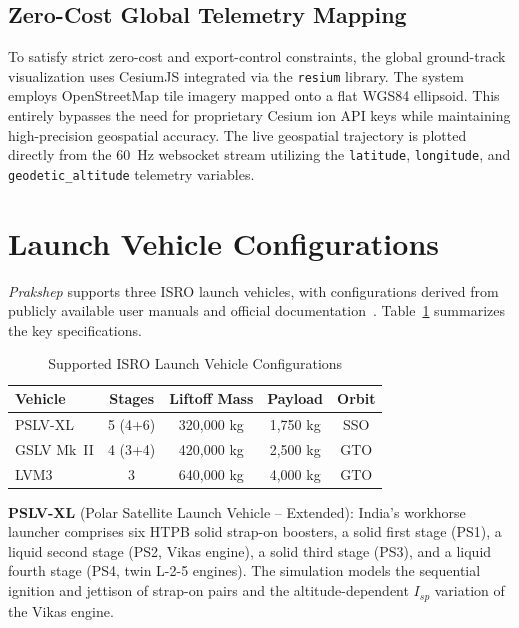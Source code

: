\documentclass[conference]{IEEEtran}
\begin{document}
\subsection{Zero-Cost Global Telemetry Mapping}

To satisfy strict zero-cost and export-control constraints, the global ground-track visualization uses CesiumJS integrated via the \texttt{resium} library. The system employs OpenStreetMap tile imagery mapped onto a flat WGS84 ellipsoid. This entirely bypasses the need for proprietary Cesium ion API keys while maintaining high-precision geospatial accuracy. The live geospatial trajectory is plotted directly from the 60~Hz websocket stream utilizing the \texttt{latitude}, \texttt{longitude}, and \texttt{geodetic\_altitude} telemetry variables.

\section{Launch Vehicle Configurations}

\textit{Prakshep} supports three ISRO launch vehicles, with configurations derived from publicly available user manuals and official documentation~\cite{isro_pslv_manual, isro_gslv_manual}. Table~\ref{tab:vehicles} summarizes the key specifications.

\begin{table}[htbp]
    \centering
    \caption{Supported ISRO Launch Vehicle Configurations}
    \label{tab:vehicles}
    \begin{tabular}{@{}lcccc@{}}
        \toprule
        \textbf{Vehicle} & \textbf{Stages} & \textbf{Liftoff Mass} & \textbf{Payload} & \textbf{Orbit} \\
        \midrule
        PSLV-XL & 5 (4+6) & 320,000 kg & 1,750 kg & SSO \\
        GSLV Mk~II & 4 (3+4) & 420,000 kg & 2,500 kg & GTO \\
        LVM3 & 3 & 640,000 kg & 4,000 kg & GTO \\
        \bottomrule
    \end{tabular}
\end{table}

\textbf{PSLV-XL} (Polar Satellite Launch Vehicle -- Extended): India's workhorse launcher comprises six HTPB solid strap-on boosters, a solid first stage (PS1), a liquid second stage (PS2, Vikas engine), a solid third stage (PS3), and a liquid fourth stage (PS4, twin L-2-5 engines). The simulation models the sequential ignition and jettison of strap-on pairs and the altitude-dependent $I_{sp}$ variation of the Vikas engine.
\end{document}
